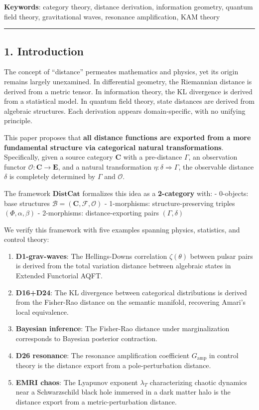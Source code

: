 \documentclass[
]{article}
\providecommand{\tightlist}{%
  \setlength{\itemsep}{0pt}\setlength{\parskip}{0pt}}
\begin{document}
\textbf{Keywords}: category theory, distance derivation, information
geometry, quantum field theory, gravitational waves, resonance
amplification, KAM theory

\begin{center}\rule{0.5\linewidth}{0.5pt}\end{center}

\subsection{1. Introduction}\label{introduction}

The concept of ``distance'' permeates mathematics and physics, yet its
origin remains largely unexamined. In differential geometry, the
Riemannian distance is derived from a metric tensor. In information
theory, the KL divergence is derived from a statistical model. In
quantum field theory, state distances are derived from algebraic
structures. Each derivation appears domain-specific, with no unifying
principle.

This paper proposes that \textbf{all distance functions are exported
from a more fundamental structure via categorical natural
transformations}. Specifically, given a source category \(\mathbf{C}\)
with a pre-distance \(\Gamma\), an observation functor
\(\mathcal{O}: \mathbf{C} \to \mathbf{E}\), and a natural transformation
\(\eta: \delta \Rightarrow \Gamma\), the observable distance \(\delta\)
is completely determined by \(\Gamma\) and \(\mathcal{O}\).

The framework \(\mathbf{DistCat}\) formalizes this idea as a
\textbf{2-category} with: - 0-objects: base structures
\(\mathcal{B} = (\mathbf{C}, \mathcal{F}, \mathcal{O})\) - 1-morphisms:
structure-preserving triples \((\Phi, \alpha, \beta)\) - 2-morphisms:
distance-exporting pairs \((\Gamma, \delta)\)

We verify this framework with five examples spanning physics,
statistics, and control theory:

\begin{enumerate}
\def\labelenumi{\arabic{enumi}.}
\tightlist
\item
  \textbf{D1-grav-waves}: The Hellings-Downs correlation
  \(\zeta(\theta)\) between pulsar pairs is derived from the total
  variation distance between algebraic states in Extended Functorial
  AQFT.
\item
  \textbf{D16+D24}: The KL divergence between categorical distributions
  is derived from the Fisher-Rao distance on the semantic manifold,
  recovering Amari's local equivalence.
\item
  \textbf{Bayesian inference}: The Fisher-Rao distance under
  marginalization corresponds to Bayesian posterior contraction.
\item
  \textbf{D26 resonance}: The resonance amplification coefficient
  \(G_{\text{amp}}\) in control theory is the distance export from a
  pole-perturbation distance.
\item
  \textbf{EMRI chaos}: The Lyapunov exponent \(\lambda_T\)
  characterizing chaotic dynamics near a Schwarzschild black hole
  immersed in a dark matter halo is the distance export from a
  metric-perturbation distance.
\end{enumerate}
\end{document}
